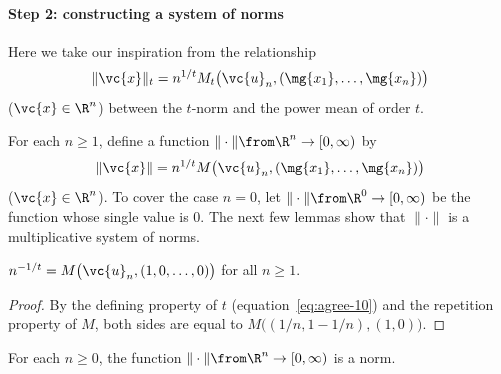 \paragraph*{Step 2: constructing a system of norms} 
Here we take our inspiration from the relationship
\[
\|\vc{x}\|_t
=
n^{1/t} 
M_t\bigl(
\vc{u}_n, (\mg{x_1}, \ldots, \mg{x_n})
\bigr)
\]
($\vc{x} \in \R^n$) between the $t$-norm and the power mean of order $t$.

For each $n \geq 1$, define a function $\|\cdot\| \from \R^n \to [0,
  \infty)$ by
\[
\|\vc{x}\|
=
n^{1/t} 
M\bigl(
\vc{u}_n, (\mg{x_1}, \ldots, \mg{x_n})
\bigr)
\]
($\vc{x} \in \R^n$).  To cover the case $n = 0$, let $\|\cdot\| \from \R^0
\to [0, \infty)$ be the function whose single value is $0$.  The next few
lemmas show that $\|\cdot\|$ is a multiplicative system of norms.

\begin{lemma}
$n^{-1/t} = M\bigl(\vc{u}_n, (1, 0, \ldots, 0)\bigr)$ for all $n \geq 1$.  
\end{lemma}

\begin{proof}
By the defining property of $t$ (equation~\eqref{eq:agree-10}) and the
repetition property of $M$, both sides are equal to $M\bigl( (1/n, 1 -
1/n), (1, 0) \bigr)$.
\end{proof}

\begin{lemma}
For each $n \geq 0$, the function $\|\cdot\| \from \R^n \to [0, \infty)$
  is a norm.
\end{lemma}

